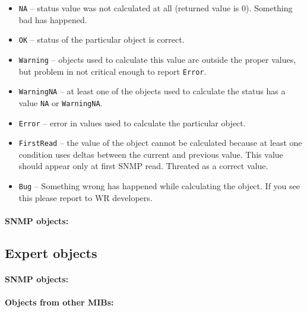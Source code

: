 \begin{itemize}%
  \item \texttt{NA} -- status value was not calculated at all (returned value
    is 0). Something bad has happened.
  \item \texttt{OK} -- status of the particular object is correct.
  \item \texttt{Warning} -- objects used to calculate this value are outside the
    proper values, but problem in not critical enough to report \texttt{Error}.
  \item \texttt{WarningNA} -- at least one of the objects used to calculate the
    status has a value \texttt{NA} or \texttt{WarningNA}.
  \item \texttt{Error} -- error in values used to calculate the particular
    object.
  \item \texttt{FirstRead} -- the value of the object cannot be calculated
    because at least one condition uses deltas between the current and previous
    value. This value should appear only at first SNMP read. Threated as a
    correct value.
  \item \texttt{Bug} -- Something wrong has happened while calculating the
    object. If you see this please report to WR developers.
\end{itemize}

\paragraph*{SNMP objects:}

\printnoidxglossary[type=snmp_status,title=,style=objtree,sort=def]

\newpage
\subsection{Expert objects}
\label{sec:snmp_exports:expert}

\paragraph*{SNMP objects:}
\printnoidxglossary[type=snmp_expert,style=objtree,sort=def]

\vspace{12pt}
\paragraph*{Objects from other MIBs:}
\printnoidxglossary[type=snmp_other,style=objtree,sort=def]

%
%
